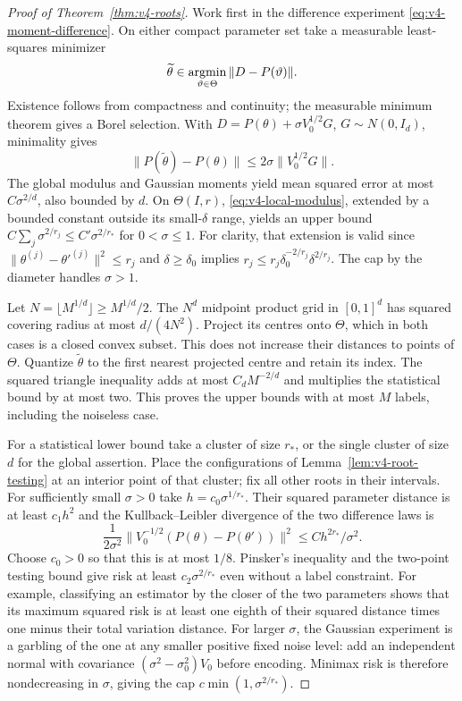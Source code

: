 \begin{proof}[Proof of Theorem~\ref{thm:v4-roots}]
Work first in the difference experiment
\eqref{eq:v4-moment-difference}. On either compact parameter set take
a measurable least-squares minimizer
\[
 \widetilde\theta\in\operatorname*{argmin}_{\vartheta\in\Theta}
           \|D-P(\vartheta)\|.
\]
Existence follows from compactness and continuity; the measurable
minimum theorem gives a Borel selection. With
$D=P(\theta)+\sigma V_0^{1/2}G$, $G\sim N(0,I_d)$, minimality gives
\begin{equation}
 \|P(\widetilde\theta)-P(\theta)\|
 \le2\sigma\|V_0^{1/2}G\|.                                    \label{eq:v4-minimum-distance}
\end{equation}
The global modulus and Gaussian moments yield mean squared error
at most $C\sigma^{2/d}$, also bounded by $d$.
On $\Theta(I,r)$, \eqref{eq:v4-local-modulus}, extended by a bounded
constant outside its small-$\delta$ range, yields an upper bound
$C\sum_j\sigma^{2/r_j}\le C'\sigma^{2/r_*}$ for $0<\sigma\le1$.
For clarity, that extension is valid since
$\|\theta^{(j)}-\theta'^{(j)}\|^2\le r_j$ and
$\delta\ge\delta_0$ implies
$r_j\le r_j\delta_0^{-2/r_j}\delta^{2/r_j}$.
The cap by the diameter handles $\sigma>1$.

Let $N=\lfloor M^{1/d}\rfloor\ge M^{1/d}/2$. The $N^d$ midpoint
product grid in $[0,1]^d$ has squared covering radius at most
$d/(4N^2)$. Project its centres onto $\Theta$, which in both cases
is a closed convex subset. This does not increase their distances
to points of $\Theta$. Quantize $\widetilde\theta$ to the first
nearest projected centre and retain its index. The squared triangle
inequality adds at most $C_dM^{-2/d}$ and multiplies the statistical
bound by at most two. This proves the upper bounds with at most
$M$ labels, including the noiseless case.

For a statistical lower bound take a cluster of size $r_*$, or the
single cluster of size $d$ for the global assertion. Place the
configurations of Lemma~\ref{lem:v4-root-testing} at an interior
point of that cluster; fix all other roots in their intervals.
For sufficiently small $\sigma>0$ take $h=c_0\sigma^{1/r_*}$.
Their squared parameter distance is at least $c_1h^2$ and the
Kullback--Leibler divergence of the two difference laws is
\[
 \frac1{2\sigma^2}
 \|V_0^{-1/2}(P(\theta)-P(\theta'))\|^2
 \le C h^{2r_*}/\sigma^2.
\]
Choose $c_0>0$ so that this is at most $1/8$. Pinsker's inequality
and the two-point testing bound give risk at least
$c_2\sigma^{2/r_*}$ even without a label constraint. For example,
classifying an estimator by the closer of the two parameters
shows that its maximum squared risk is at least one eighth of their
squared distance times one minus their total variation distance.
For larger $\sigma$, the Gaussian experiment is a garbling of the
one at any smaller positive fixed noise level: add an independent
normal with covariance $(\sigma^2-\sigma_0^2)V_0$ before encoding.
Minimax risk is therefore nondecreasing in $\sigma$, giving the
cap $c\min(1,\sigma^{2/r_*})$.


\end{proof}
